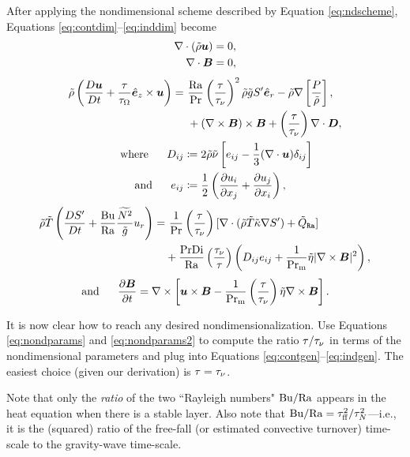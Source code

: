 \documentclass[12pt]{article}
\numberwithin{equation}{section}
\newcommand{\tauovertaunu}{\left(\frac{\tau}{\taunu}\right)}
\begin{document}
	After applying the nondimensional scheme described by Equation \eqref{eq:ndscheme}, Equations \eqref{eq:contdim}--\eqref{eq:inddim} become 
	\begin{align}
	\nabla\cdot(\tilde{\rho}\bm{u}) &= 0\label{eq:contnd},\\
	\nabla\cdot \bm{B} &= 0,
\end{align}
\begin{subequations}\label{eq:momnd}
	\begin{align}
		\rhotilde\left(\matderiv{\vecu}+\frac{\tau}{\tauomega}\ez\times\vecu\right) = &\ \frac{\ra}{\pr}\left(\frac{\tau}{\taunu}\right)^2\rhotilde\gtilde \entrprime\er         -\rhotilde\nabla\left[ \frac{P}{\rhotilde} \right], \nonumber\\
		&\ +(\curl\vecb)\times\vecb +\tauovertaunu\Div\bm{D},\\
		\where D_{ij} &\define 2\rhotilde\nutilde \left[e_{ij} - \frac{1}{3}(\Div\vecu) \delta_{ij} \right]\\
		\andd e_{ij} &\define \frac{1}{2}\left(\pderiv{u_i}{x_j} + \pderiv{u_j}{x_i} \right),
	\end{align}
\end{subequations}
\begin{align}\label{eq:ennd}
	\rhotilde\tmptilde\left( \matderiv{\entrprime} + \frac{\bu}{\ra}\frac{\nsqtilde}{\gtilde} u_r\right)  = &\ \frac{1}{\pr}\tauovertaunu[\Div(\rhotilde \tmptilde \kappatilde \nabla \entrprime) + \heatra] \nonumber \\
	& + \frac{\pr\di}{\ra}\left(\frac{\taunu}{\tau}\right)\left( D_{ij}e_{ij} + \frac{1}{\prm} \etatilde|\curl\vecb|^2\right),
\end{align}
\begin{align}\label{eq:indnd}
	\andd \pderiv{\vecb}{t} = \curl\left[\vecu\times\vecb - \frac{1}{\prm}\tauovertaunu\etatilde\curl\vecb\right].
\end{align}	

It is now clear how to reach any desired nondimensionalization. Use Equations \eqref{eq:nondparams} and \eqref{eq:nondparams2} to compute the ratio $\tau/\tau_{\nu}$ in terms of the nondimensional parameters and plug into Equations \eqref{eq:contgen}--\eqref{eq:indgen}. The easiest choice (given our derivation) is $\tau=\tau_{\nu}$.

Note that only the \textit{ratio} of the two ``Rayleigh numbers" ${\rm{Bu}}/{\rm{Ra}}$ appears in the heat equation when there is a stable layer. Also note that ${\rm{Bu}}/{\rm{Ra}}=\tau_{\rm ff}^2/\tau_N^2$---i.e., it is the (squared) ratio of the free-fall (or estimated convective turnover) time-scale to the gravity-wave time-scale.  
\end{document}
